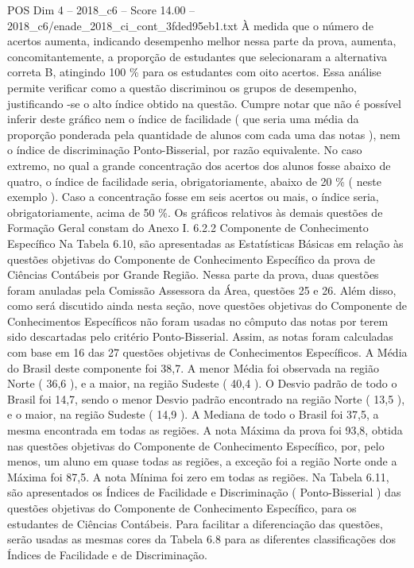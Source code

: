 \begin{textsample}{POS Dim 4 – 2018\_c6 – Score 14.00 – 2018\_c6/enade\_2018\_ci\_cont\_3fded95eb1.txt}
À medida que o número de acertos aumenta, indicando desempenho melhor nessa parte da prova, aumenta, concomitantemente, a proporção de estudantes que selecionaram a alternativa correta B, atingindo 100 \% para os estudantes com oito acertos.
Essa análise permite verificar como a questão discriminou os grupos de desempenho, justificando -se o alto índice obtido na questão.
Cumpre notar que não é possível inferir deste gráfico nem o índice de facilidade ( que seria uma média da proporção ponderada pela quantidade de alunos com cada uma das notas ), nem o índice de discriminação Ponto-Bisserial, por razão equivalente.
No caso extremo, no qual a grande concentração dos acertos dos alunos fosse abaixo de quatro, o índice de facilidade seria, obrigatoriamente, abaixo de 20 \% ( neste exemplo ).
Caso a concentração fosse em seis acertos ou mais, o índice seria, obrigatoriamente, acima de 50 \%.
Os gráficos relativos às demais questões de Formação Geral constam do Anexo I. 6.2.2 Componente de Conhecimento Específico Na Tabela 6.10, são apresentadas as Estatísticas Básicas em relação às questões objetivas do Componente de Conhecimento Específico da prova de Ciências Contábeis por Grande Região.
Nessa parte da prova, duas questões foram anuladas pela Comissão Assessora da Área, questões 25 e 26.
Além disso, como será discutido ainda nesta seção, nove questões objetivas do Componente de Conhecimentos Específicos não foram usadas no cômputo das notas por terem sido descartadas pelo critério Ponto-Bisserial.
Assim, as notas foram calculadas com base em 16 das 27 questões objetivas de Conhecimentos Específicos.
A Média do Brasil deste componente foi 38,7.
A menor Média foi observada na região Norte ( 36,6 ), e a maior, na região Sudeste ( 40,4 ).
O Desvio padrão de todo o Brasil foi 14,7, sendo o menor Desvio padrão encontrado na região Norte ( 13,5 ), e o maior, na região Sudeste ( 14,9 ).
A Mediana de todo o Brasil foi 37,5, a mesma encontrada em todas as regiões.
A nota Máxima da prova foi 93,8, obtida nas questões objetivas do Componente de Conhecimento Específico, por, pelo menos, um aluno em quase todas as regiões, a exceção foi a região Norte onde a Máxima foi 87,5.
A nota Mínima foi zero em todas as regiões.
Na Tabela 6.11, são apresentados os Índices de Facilidade e Discriminação ( Ponto-Bisserial ) das questões objetivas do Componente de Conhecimento Específico, para os estudantes de Ciências Contábeis.
Para facilitar a diferenciação das questões, serão usadas as mesmas cores da Tabela 6.8 para as diferentes classificações dos Índices de Facilidade e de Discriminação.

\end{textsample}
